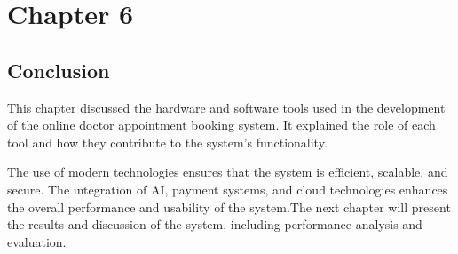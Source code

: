 \chapter{Chapter 6}

\section{Conclusion}

This chapter discussed the hardware and software tools used in the development of the online doctor appointment booking system. It explained the role of each tool and how they contribute to the system’s functionality.

The use of modern technologies ensures that the system is efficient, scalable, and secure. The integration of AI, payment systems, and cloud technologies enhances the overall performance and usability of the system.The next chapter will present the results and discussion of the system, including performance analysis and evaluation.
